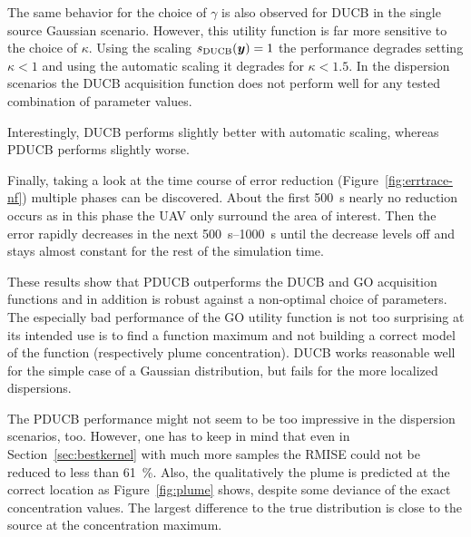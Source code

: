 The same behavior for the choice of $\gamma$ is also observed for DUCB in the 
single source Gaussian scenario. However, this utility function is far more 
sensitive to the choice of $\kappa$. Using the scaling $s_{\mathrm{DUCB}}(\bm{y}) = 1$ 
the performance degrades setting $\kappa < 1$ and using the automatic scaling it 
degrades for $\kappa < 1.5$. In the dispersion scenarios the DUCB acquisition 
function does not perform well for any tested combination of parameter values.

Interestingly,  DUCB performs slightly better with automatic scaling, whereas 
PDUCB performs slightly worse.

Finally, taking a look at the time course of error reduction 
(Figure~\ref{fig:errtrace-nf}) multiple phases can be discovered. About the 
first \SI{500}{\second} nearly no reduction occurs as in this phase the UAV only 
surround the area of interest. Then the error rapidly decreases in the next 
\SIrange{500}{1000}{\second} until the decrease levels off and stays almost 
constant for the rest of the simulation time.

These results show that PDUCB outperforms the DUCB and GO acquisition functions 
and in addition is robust against a non-optimal choice of parameters. The 
especially bad performance of the GO utility function is not too surprising at 
its intended use is to find a function maximum and not building a correct model 
of the function (respectively plume concentration).  DUCB works reasonable well 
for the simple case of a Gaussian distribution, but fails for the more localized 
dispersions.

The PDUCB performance might not seem to be too impressive in the dispersion 
scenarios, too. However, one has to keep in mind that even in 
Section~\ref{sec:bestkernel} with much more samples the RMISE could not be 
reduced to less than \SI{61}{\percent}.  Also, the qualitatively the plume is 
predicted at the correct location as Figure~\ref{fig:plume} shows, despite some 
deviance of the exact concentration values. The largest difference to the true 
distribution is close to the source at the concentration maximum.

